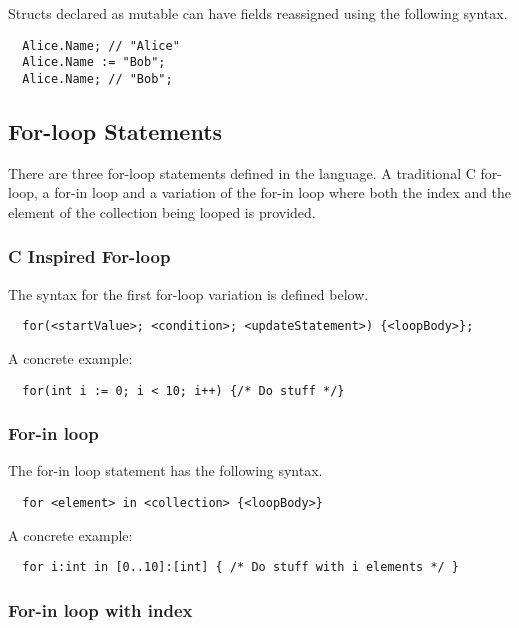 Structs declared as mutable can have fields reassigned using the following syntax.

\begin{verbatim}
  Alice.Name; // "Alice"
  Alice.Name := "Bob";
  Alice.Name; // "Bob";
\end{verbatim}

\subsection{For-loop Statements}
\label{sec:forLoopStatements}

There are three for-loop statements defined in the language. A traditional C for-loop, a for-in loop and a variation of the for-in loop where both the index and the element of the collection being looped is provided.

\subsubsection{C Inspired For-loop}
\label{sec:cForLoop}

The syntax for the first for-loop variation is defined below.

\begin{verbatim}
  for(<startValue>; <condition>; <updateStatement>) {<loopBody>};
\end{verbatim}

A concrete example:

\begin{verbatim}
  for(int i := 0; i < 10; i++) {/* Do stuff */}
\end{verbatim}

\subsubsection{For-in loop}
\label{sec:forInLoop}

The for-in loop statement has the following syntax.

\begin{verbatim}
  for <element> in <collection> {<loopBody>}
\end{verbatim}

A concrete example:

\begin{verbatim}
  for i:int in [0..10]:[int] { /* Do stuff with i elements */ }
\end{verbatim}

\subsubsection{For-in loop with index}
\label{sec:forInLoopIndex}

